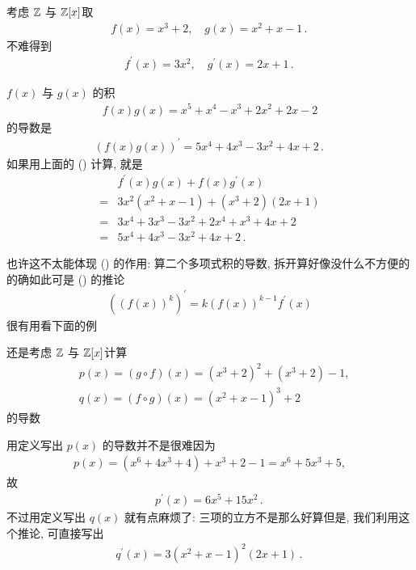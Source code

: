 \begin{example}
    考虑 $\mathbb{Z}$ 与 $\mathbb{Z}[x]$\period 取
    \begin{align*}
        f(x) = x^3 + 2, \quad g(x) = x^2 + x - 1 \period
    \end{align*}
    不难得到
    \begin{align*}
        f^{\prime} (x) = 3x^2, \quad g^{\prime} (x) = 2x + 1 \period
    \end{align*}

    $f(x)$ 与 $g(x)$ 的积
    \begin{align*}
        f(x) g(x) = x^5 + x^4 - x^3 + 2x^2 + 2x - 2
    \end{align*}
    的导数是
    \begin{align*}
        (f(x) g(x))^{\prime} = 5x^4 + 4x^3 - 3x^2 + 4x + 2 \period
    \end{align*}
    如果用上面的 (\myStar) 计算, 就是
    \begin{align*}
             & f^{\prime} (x) g(x) + f(x) g^{\prime} (x) \\
        = {} & 3x^2 (x^2 + x - 1) + (x^3 + 2) (2x + 1)   \\
        = {} & 3x^4 + 3x^3 - 3x^2 + 2x^4 + x^3 + 4x + 2  \\
        = {} & 5x^4 + 4x^3 - 3x^2 + 4x + 2 \period
    \end{align*}
\end{example}

也许这不太能体现 (\myStar) 的作用: 算二个多项式积的导数, 拆开算好像没什么不方便的\period 的确如此\period 可是 (\myStar) 的推论
\begin{align*}
    ((f(x))^k)^{\prime} = k(f(x))^{k-1} f^{\prime}(x)
\end{align*}
很有用\period 看下面的例\period

\begin{example}
    还是考虑 $\mathbb{Z}$ 与 $\mathbb{Z}[x]$\period 计算
    \begin{align*}
         & p(x) = (g \circ f) (x) = (x^3 + 2)^2 + (x^3 + 2) - 1, \\
         & q(x) = (f \circ g) (x) = (x^2 + x - 1)^3 + 2
    \end{align*}
    的导数\period

    用定义写出 $p(x)$ 的导数并不是很难\period 因为
    \begin{align*}
        p(x) = (x^6 + 4x^3 + 4) + x^3 + 2 - 1 = x^6 + 5x^3 + 5,
    \end{align*}
    故
    \begin{align*}
        p^{\prime} (x) = 6x^5 + 15x^2 \period
    \end{align*}
    不过用定义写出 $q(x)$ 就有点麻烦了: 三项的立方不是那么好算\period 但是, 我们利用这个推论, 可直接写出
    \begin{align*}
        q^{\prime} (x) = 3(x^2 + x - 1)^2 (2x + 1) \period
    \end{align*}
\end{example}

